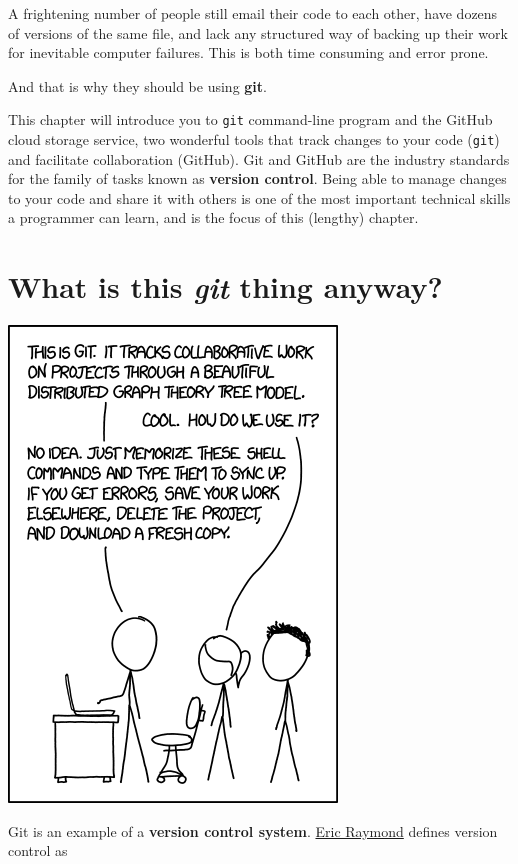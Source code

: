 \documentclass[]{book}
\theoremstyle{definition}
\theoremstyle{definition}
\theoremstyle{remark}
\begin{document}
A frightening number of people still email their code to each other,
have dozens of versions of the same file, and lack any structured way of
backing up their work for inevitable computer failures. This is both
time consuming and error prone.

And that is why they should be using \textbf{git}.

This chapter will introduce you to \texttt{git} command-line program and
the GitHub cloud storage service, two wonderful tools that track changes
to your code (\texttt{git}) and facilitate collaboration (GitHub). Git
and GitHub are the industry standards for the family of tasks known as
\textbf{version control}. Being able to manage changes to your code and
share it with others is one of the most important technical skills a
programmer can learn, and is the focus of this (lengthy) chapter.

\section{\texorpdfstring{What is this \emph{git} thing
anyway?}{What is this git thing anyway?}}\label{what-is-this-git-thing-anyway}

\href{https://xkcd.com/1597/}{\includegraphics{img/git-basics/xkcd1597.png}}

Git is an example of a \textbf{version control system}.
\href{https://en.wikipedia.org/wiki/Eric_S._Raymond}{Eric Raymond}
defines version control as
\end{document}
